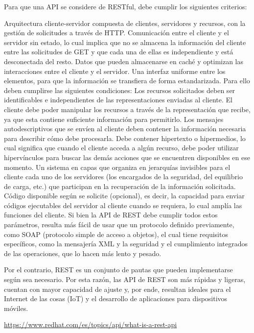 Para que una API se considere de RESTful, debe cumplir los siguientes criterios:

Arquitectura cliente-servidor compuesta de clientes, servidores y recursos, con la gestión de solicitudes a través de HTTP.
Comunicación entre el cliente y el servidor sin estado, lo cual implica que no se almacena la información del cliente entre las solicitudes de GET y que cada una de ellas es independiente y está desconectada del resto.
Datos que pueden almacenarse en caché y optimizan las interacciones entre el cliente y el servidor.
Una interfaz uniforme entre los elementos, para que la información se transfiera de forma estandarizada. Para ello deben cumplirse las siguientes condiciones:
Los recursos solicitados deben ser identificables e independientes de las representaciones enviadas al cliente.
El cliente debe poder manipular los recursos a través de la representación que recibe, ya que esta contiene suficiente información para permitirlo.
Los mensajes autodescriptivos que se envíen al cliente deben contener la información necesaria para describir cómo debe procesarla.
Debe contener hipertexto o hipermedios, lo cual significa que cuando el cliente acceda a algún recurso, debe poder utilizar hipervínculos para buscar las demás acciones que se encuentren disponibles en ese momento.
Un sistema en capas que organiza en jerarquías invisibles para el cliente cada uno de los servidores (los encargados de la seguridad, del equilibrio de carga, etc.) que participan en la recuperación de la información solicitada.
Código disponible según se solicite (opcional), es decir, la capacidad para enviar códigos ejecutables del servidor al cliente cuando se requiera, lo cual amplía las funciones del cliente. 
Si bien la API de REST debe cumplir todos estos parámetros, resulta más fácil de usar que un protocolo definido previamente, como SOAP (protocolo simple de acceso a objetos), el cual tiene requisitos específicos, como la mensajería XML y la seguridad y el cumplimiento integrados de las operaciones, que lo hacen más lento y pesado. 

Por el contrario, REST es un conjunto de pautas que pueden implementarse según sea necesario. Por esta razón, las API de REST son más rápidas y ligeras, cuentan con mayor capacidad de ajuste y, por ende, resultan ideales para el Internet de las cosas (IoT) y el desarrollo de aplicaciones para dispositivos móviles. 

\url{https://www.redhat.com/es/topics/api/what-is-a-rest-api}



